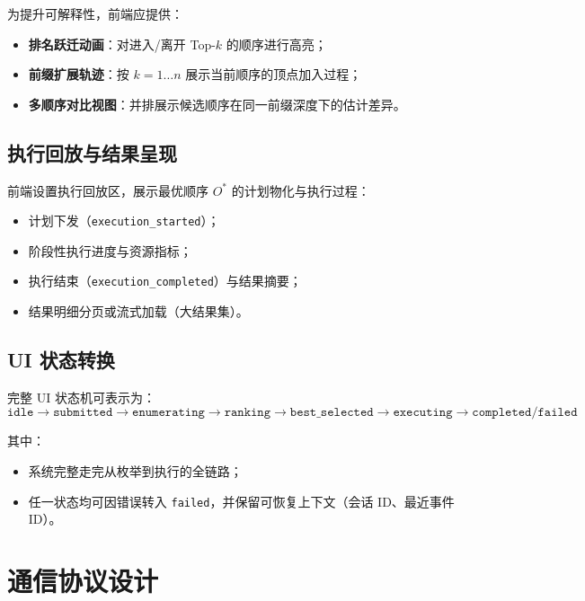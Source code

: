 \documentclass[12pt,a4paper]{article}
\begin{document}
为提升可解释性，前端应提供：
\begin{itemize}
  \item \textbf{排名跃迁动画}：对进入/离开 Top-$k$ 的顺序进行高亮；
  \item \textbf{前缀扩展轨迹}：按 $k=1\ldots n$ 展示当前顺序的顶点加入过程；
  \item \textbf{多顺序对比视图}：并排展示候选顺序在同一前缀深度下的估计差异。
\end{itemize}

\subsection{执行回放与结果呈现}

前端设置执行回放区，展示最优顺序 $O^*$ 的计划物化与执行过程：
\begin{itemize}
  \item 计划下发（\texttt{execution\_started}）；
  \item 阶段性执行进度与资源指标；
  \item 执行结束（\texttt{execution\_completed}）与结果摘要；
  \item 结果明细分页或流式加载（大结果集）。
\end{itemize}

\subsection{UI 状态转换}

完整 UI 状态机可表示为：
\[
\texttt{idle} \rightarrow \texttt{submitted} \rightarrow \texttt{enumerating}
\rightarrow \texttt{ranking} \rightarrow \texttt{best\_selected}
\rightarrow \texttt{executing} \rightarrow \texttt{completed/failed}
\]

其中：
\begin{itemize}
  \item 系统完整走完从枚举到执行的全链路；
  \item 任一状态均可因错误转入 \texttt{failed}，并保留可恢复上下文（会话 ID、最近事件 ID）。
\end{itemize}

\section{通信协议设计}
\label{sec:communication}
\end{document}

